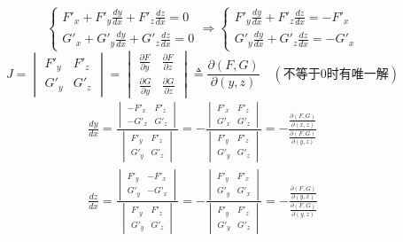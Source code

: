 $$\begin{cases}
	F'_x+F'_y\frac{dy}{dx}+F'_z\frac{dz}{dx}=0\\
	G'_x+G'_y\frac{dy}{dx}+G'_z\frac{dz}{dx}=0	
\end{cases}\Rightarrow\begin{cases}
	F'_y\frac{dy}{dx}+F'_z\frac{dz}{dx}=-F'_x\\
	G'_y\frac{dy}{dx}+G'_z\frac{dz}{dx}=-G'_x
\end{cases}$$
$$J=\begin{vmatrix}
	F'_y & F'_z\\
	G'_y & G'_z
\end{vmatrix}=\begin{vmatrix}
	\frac{\partial F}{\partial y} & \frac{\partial F}{\partial z}\\
	\frac{\partial G}{\partial y} & \frac{\partial G}{\partial z}
\end{vmatrix}\triangleq\frac{\partial(F,G)}{\partial(y,z)}\quad(\mbox{不等于0时有唯一解})$$
\begin{align*}
	\frac{dy}{dx}=\frac{\begin{vmatrix}
			-F'_x & F'_z\\
			-G'_x & G'_z
	\end{vmatrix}}{\begin{vmatrix}
			F'_y & F'_z\\
			G'_y & G'_z
	\end{vmatrix}}=-\frac{\begin{vmatrix}
			F'_x & F'_z\\
			G'_x & G'_z
	\end{vmatrix}}{\begin{vmatrix}
			F'_y & F'_z\\
			G'_y & G'_z
	\end{vmatrix}}=-\frac{\frac{\partial(F,G)}{\partial(x,z)}}{\frac{\partial(F,G)}{\partial(y,z)}}\\
	\frac{dz}{dx}=\frac{\begin{vmatrix}
			F'_y & -F'_x\\
			G'_y & -G'_x
	\end{vmatrix}}{\begin{vmatrix}
			F'_y & F'_z\\
			G'_y & G'_z
	\end{vmatrix}}=-\frac{\begin{vmatrix}
			F'_y & F'_x\\
			G'_y & G'_x
	\end{vmatrix}}{\begin{vmatrix}
			F'_y & F'_z\\
			G'_y & G'_z
	\end{vmatrix}}=-\frac{\frac{\partial(F,G)}{\partial(y,x)}}{\frac{\partial(F,G)}{\partial(y,z)}}
\end{align*}
